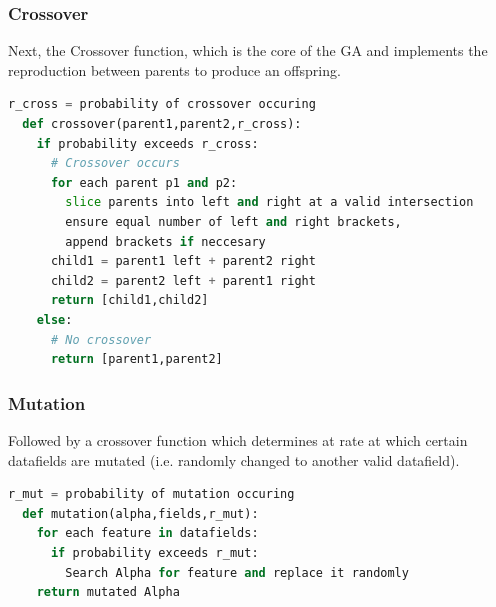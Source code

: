 \documentclass[a4paper,12pt]{report}
\numberwithin{equation}{section}
\theoremstyle{definition}
\begin{document}
\subsubsection{Crossover}
Next, the Crossover function, which is the core of the GA and implements the reproduction between parents to produce an offspring.
\begin{lstlisting}[language=Python, caption=Crossover Function Pseudocode, basicstyle=\footnotesize\ttfamily]
  r_cross = probability of crossover occuring
  def crossover(parent1,parent2,r_cross):
    if probability exceeds r_cross:
      # Crossover occurs
      for each parent p1 and p2:
        slice parents into left and right at a valid intersection
        ensure equal number of left and right brackets, 
        append brackets if neccesary
      child1 = parent1 left + parent2 right
      child2 = parent2 left + parent1 right
      return [child1,child2]
    else:
      # No crossover
      return [parent1,parent2]
\end{lstlisting}

\subsubsection{Mutation}
Followed by a crossover function which determines at rate at which certain datafields are mutated (i.e. randomly changed to another valid datafield).
\begin{lstlisting}[language=Python, caption=Mutation Function Pseudocode, basicstyle=\footnotesize\ttfamily]
  r_mut = probability of mutation occuring
  def mutation(alpha,fields,r_mut):
    for each feature in datafields:
      if probability exceeds r_mut:
        Search Alpha for feature and replace it randomly
    return mutated Alpha
\end{lstlisting}
\end{document}
